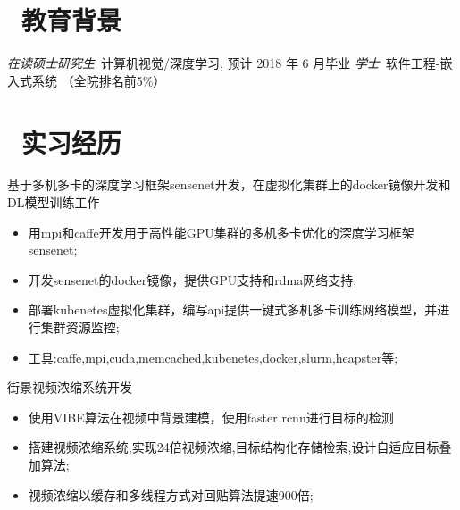 \documentclass{resume}
\begin{document}


\basicInfo{
  \email{mxl.m@qq.com} \textperiodcentered\ 
  \phone{(+86) 15600519843} \textperiodcentered\ 
  \linkedin[xiaolong-ma]{https://www.linkedin.com/in/xiaolong-ma-06501bb6}}
 
\section{\faGraduationCap\ 教育背景}
\textit{在读硕士研究生}\ 计算机视觉/深度学习, 预计 2018 年 6 月毕业
\textit{学士}\ 软件工程-嵌入式系统 （全院排名前5\%）

\section{\faUsers\ 实习经历}
\role{见习算法研究员}{部门: 算法平台部}
基于多机多卡的深度学习框架sensenet开发，在虚拟化集群上的docker镜像开发和DL模型训练工作
\begin{itemize}
  \item 用mpi和caffe开发用于高性能GPU集群的多机多卡优化的深度学习框架sensenet;
  \item 开发sensenet的docker镜像，提供GPU支持和rdma网络支持;
  \item 部署kubenetes虚拟化集群，编写api提供一键式多机多卡训练网络模型，并进行集群资源监控;
  \item 工具:caffe,mpi,cuda,memcached,kubenetes,docker,slurm,heapster等;
\end{itemize}

街景视频浓缩系统开发
\begin{itemize}
  \item 使用VIBE算法在视频中背景建模，使用faster rcnn进行目标的检测
  \item 搭建视频浓缩系统,实现24倍视频浓缩,目标结构化存储检索,设计自适应目标叠加算法;
  \item 视频浓缩以缓存和多线程方式对回贴算法提速900倍;
\end{itemize}
\end{document}
